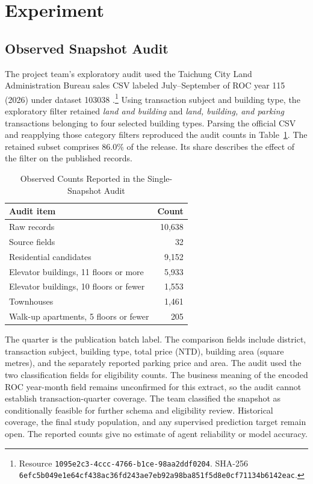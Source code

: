 \section{Experiment}
\label{sec:evaluation}

\subsection{Observed Snapshot Audit}
\label{sec:data}
The project team's exploratory audit used the Taichung City Land Administration Bureau sales CSV labeled July--September of ROC year 115 (2026) under dataset 103038 \cite{taichung}.\footnote{Resource \texttt{1095e2c3-4ccc-4766-b1ce-98aa2ddf0204}. SHA-256 \texttt{6efc5b04\allowbreak{}9e1e64cf\allowbreak{}438ac36f\allowbreak{}d243ae7e\allowbreak{}b92a98ba\allowbreak{}851f5d8e\allowbreak{}0cf71134\allowbreak{}b6142eac}.} Using transaction subject and building type, the exploratory filter retained \emph{land and building} and \emph{land, building, and parking} transactions belonging to four selected building types. Parsing the official CSV and reapplying those category filters reproduced the audit counts in Table~\ref{tab:snapshot}. The retained subset comprises 86.0\% of the release. Its share describes the effect of the filter on the published records.


\begin{table}[t]
\caption{Observed Counts Reported in the Single-Snapshot Audit}
\label{tab:snapshot}
\centering
\begin{tabularx}{\columnwidth}{@{}Xr@{}}
\toprule
Audit item & Count \\
\midrule
Raw records & 10,638 \\
Source fields & 32 \\
Residential candidates & 9,152 \\
\quad Elevator buildings, 11 floors or more & 5,933 \\
\quad Elevator buildings, 10 floors or fewer & 1,553 \\
\quad Townhouses & 1,461 \\
\quad Walk-up apartments, 5 floors or fewer & 205 \\
\bottomrule
\end{tabularx}
\end{table}


The quarter is the publication batch label. The comparison fields include district, transaction subject, building type, total price (NTD), building area (square metres), and the separately reported parking price and area. The audit used the two classification fields for eligibility counts. The business meaning of the encoded ROC year-month field remains unconfirmed for this extract, so the audit cannot establish transaction-quarter coverage. The team classified the snapshot as conditionally feasible for further schema and eligibility review. Historical coverage, the final study population, and any supervised prediction target remain open. The reported counts give no estimate of agent reliability or model accuracy.

